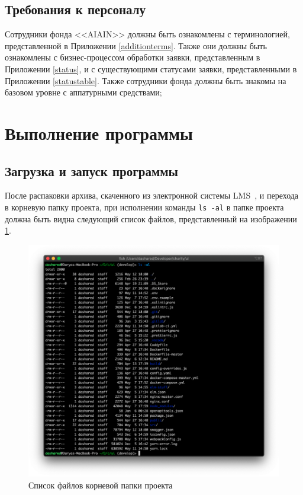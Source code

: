 \documentclass[a4paper,12pt,reqno]{article}
\begin{document}
	\subsection{Требования к персоналу}
	Сотрудники фонда <<AIAIN>> должны быть ознакомлены с терминологией, представленной в Приложении \ref{additionterms}. Также они должны быть ознакомлены с бизнес-процессом обработки заявки, представленным в Приложении \ref{status}, и с существующими статусами заявки, представленными в Приложении \ref{statustable}. Также сотрудники фонда должны быть знакомы на базовом уровне с аппатурными средствами;
	
	\newpage 
	\section{Выполнение программы}
	\subsection{Загрузка и запуск программы}
	
	После распаковки архива, скаченного из электронной системы LMS~\cite{lms}, и перехода в корневую папку проекта, при исполнении команды \texttt{ls -al} в папке проекта должна быть видна следующий список файлов, представленный на изображении \ref{pic: ls}.
	
	\begin{figure}[H]
		\centering
		\includegraphics[width = 0.9\linewidth]{img/ro/ls.png}
		\caption{Список файлов корневой папки проекта}
		\label{pic: ls}
	\end{figure}
\end{document}
